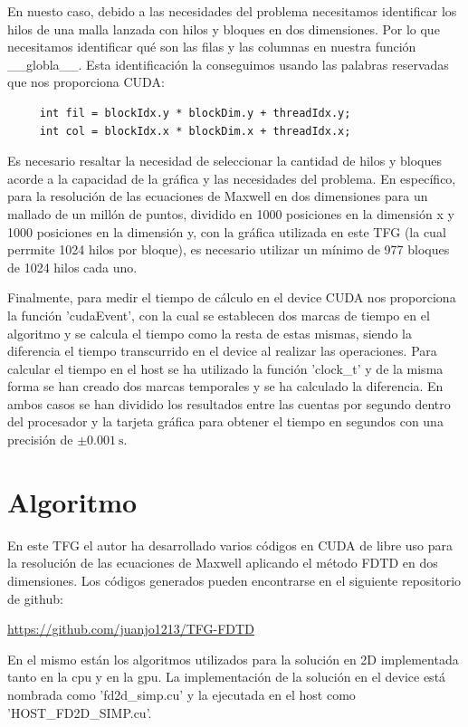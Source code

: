 \documentclass[11pt,a4paper,twoside,pdf]{article}
\numberwithin{equation}{section}
\begin{document}
En nuesto caso, debido a las necesidades del problema necesitamos identificar los hilos de una malla lanzada con hilos y bloques en dos dimensiones. Por lo que necesitamos identificar qué son las filas y las columnas en nuestra función \_\_globla\_\_. Esta identificación la conseguimos usando las palabras reservadas que nos proporciona CUDA:

\begin{verbatim}
     int fil = blockIdx.y * blockDim.y + threadIdx.y;
     int col = blockIdx.x * blockDim.x + threadIdx.x;
\end{verbatim}

Es necesario resaltar la necesidad de seleccionar la cantidad de hilos y bloques acorde a la capacidad de la gráfica y las necesidades del problema. En específico, para la resolución de las ecuaciones de Maxwell en dos dimensiones para un mallado de un millón de puntos, dividido en 1000 posiciones en la dimensión x y 1000 posiciones en la dimensión y, con la gráfica utilizada en este TFG (la cual perrmite 1024 hilos por bloque), es necesario utilizar un mínimo de 977 bloques de 1024 hilos cada uno.


Finalmente, para medir el tiempo de cálculo en el device CUDA nos proporciona la función 'cudaEvent', con la cual se establecen dos marcas de tiempo en el algoritmo y se calcula el tiempo como la resta de estas mismas, siendo la diferencia el tiempo transcurrido en el device al realizar las operaciones.
Para calcular el tiempo en el host se ha utilizado la función 'clock\_t' y de la misma forma se han creado dos marcas temporales y se ha calculado la diferencia. En ambos casos se han dividido los resultados entre las cuentas por segundo dentro del procesador y la tarjeta gráfica para obtener el tiempo en segundos con una precisión de $\pm \SI{0.001}{\second}$.

\section{Algoritmo}
En este TFG el autor ha desarrollado varios códigos en CUDA de libre uso para la resolución de las ecuaciones de Maxwell aplicando el método FDTD en dos dimensiones. Los códigos generados pueden encontrarse en el siguiente repositorio de github:

\url{https://github.com/juanjo1213/TFG-FDTD}

En el mismo están los algoritmos utilizados para la solución en 2D implementada tanto en la cpu y en la gpu. La implementación de la solución en el device está nombrada como 'fd2d\_simp.cu' y la ejecutada en el host como 'HOST\_FD2D\_SIMP.cu'.
\end{document}
